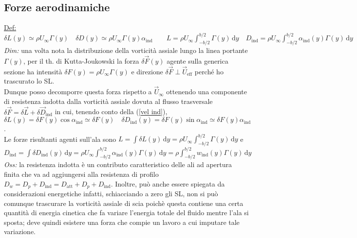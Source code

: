 \documentclass[11pt,a4paper]{report}
\newcommand{\de}{\mathrm d}
\begin{document}
		\subsection{Forze aerodinamiche}
		\underline{Def:} $\delta L(y)\simeq\rho U_\infty\Gamma(y)\quad\delta D(y)\simeq\rho U_\infty\Gamma(y)\alpha_\mathrm{ind}\qquad L=\rho U_\infty\int_{-b/2}^{b/2}\Gamma(y)\,\de y\quad D_\mathrm{ind}=\rho U_\infty\int_{-b/2}^{b/2}\alpha_\mathrm{ind}(y)\Gamma(y)\,\de y$\\
		\textit{Dim:} una volta nota la distribuzione della vorticità assiale lungo la linea portante $\Gamma(y)$, per il th. di Kutta-Joukowski la forza $\delta\vec F(y)$ agente sulla generica sezione ha intensità $\delta F(y)=\rho U_\infty\Gamma(y)$ e direzione $\delta\vec F\perp\vec U_\mathrm{eff}$ perché ho trascurato lo SL.\\
		Dunque posso decomporre questa forza rispetto a $\vec U_\infty$ ottenendo una componente di resistenza indotta dalla vorticità assiale dovuta al flusso trasversale $\delta\vec F=\delta\vec L+\delta\vec D_\mathrm{ind}$ in cui, tenendo conto della (\ref{vel ind}), $\delta L(y)=\delta F(y)\cos\alpha_\mathrm{ind}\simeq\delta F(y)\quad\delta D_\mathrm{ind}(y)=\delta F(y)\sin\alpha_\mathrm{ind}\simeq\delta F(y)\alpha_\mathrm{ind}$.\\
		Le forze risultanti agenti sull'ala sono $L=\int\delta L(y)\,\de y=\rho U_\infty\int_{-b/2}^{b/2}\Gamma(y)\,\de y$ e $D_\mathrm{ind}=\int\delta D_\mathrm{ind}(y)\,\de y=\rho U_\infty\int_{-b/2}^{b/2}\alpha_\mathrm{ind}(y)\Gamma(y)\,\de y=\rho\int_{-b/2}^{b/2}w_\mathrm{ind}(y)\Gamma(y)\,\de y$\\
		\textit{Oss:} la resistenza indotta è un contributo caratteristico delle ali ad apertura finita che va ad aggiungersi alla resistenza di profilo $D_w=D_p+D_\mathrm{ind}=D_\mathrm{att}+D_p+D_\mathrm{ind}$. Inoltre, può anche essere spiegata da considerazioni energetiche infatti, schiacciando a zero gli SL, non si può comunque trascurare la vorticità assiale di scia poichè questa contiene una certa quantità di energia cinetica che fa variare l'energia totale del fluido mentre l'ala si sposta; deve quindi esistere una forza che compie un lavoro a cui imputare tale variazione.
		
\end{document}
